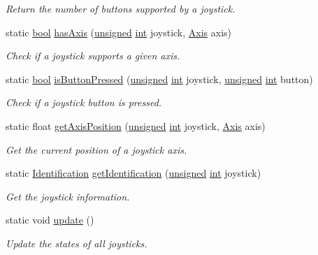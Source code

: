 \begin{DoxyCompactItemize}
\begin{DoxyCompactList}\small\item\em Return the number of buttons supported by a joystick. \end{DoxyCompactList}\item 
static \hyperlink{term__entry_8h_a002004ba5d663f149f6c38064926abac}{bool} \hyperlink{classsf_1_1_joystick_a268e8f2a11ae6af4a47c727cb4ab4d95}{has\-Axis} (\hyperlink{curses_8priv_8h_aca40206900cfc164654362fa8d4ad1e6}{unsigned} \hyperlink{term__entry_8h_ad65b480f8c8270356b45a9890f6499ae}{int} joystick, \hyperlink{classsf_1_1_joystick_a48db337092c2e263774f94de6d50baa7}{Axis} axis)
\begin{DoxyCompactList}\small\item\em Check if a joystick supports a given axis. \end{DoxyCompactList}\item 
static \hyperlink{term__entry_8h_a002004ba5d663f149f6c38064926abac}{bool} \hyperlink{classsf_1_1_joystick_ae0d97a4b84268cbe6a7078e1b2717835}{is\-Button\-Pressed} (\hyperlink{curses_8priv_8h_aca40206900cfc164654362fa8d4ad1e6}{unsigned} \hyperlink{term__entry_8h_ad65b480f8c8270356b45a9890f6499ae}{int} joystick, \hyperlink{curses_8priv_8h_aca40206900cfc164654362fa8d4ad1e6}{unsigned} \hyperlink{term__entry_8h_ad65b480f8c8270356b45a9890f6499ae}{int} button)
\begin{DoxyCompactList}\small\item\em Check if a joystick button is pressed. \end{DoxyCompactList}\item 
static float \hyperlink{classsf_1_1_joystick_aea4930193331df1851b709f3060ba58b}{get\-Axis\-Position} (\hyperlink{curses_8priv_8h_aca40206900cfc164654362fa8d4ad1e6}{unsigned} \hyperlink{term__entry_8h_ad65b480f8c8270356b45a9890f6499ae}{int} joystick, \hyperlink{classsf_1_1_joystick_a48db337092c2e263774f94de6d50baa7}{Axis} axis)
\begin{DoxyCompactList}\small\item\em Get the current position of a joystick axis. \end{DoxyCompactList}\item 
static \hyperlink{structsf_1_1_joystick_1_1_identification}{Identification} \hyperlink{classsf_1_1_joystick_aa917c9435330e6e0368d3893672d1b74}{get\-Identification} (\hyperlink{curses_8priv_8h_aca40206900cfc164654362fa8d4ad1e6}{unsigned} \hyperlink{term__entry_8h_ad65b480f8c8270356b45a9890f6499ae}{int} joystick)
\begin{DoxyCompactList}\small\item\em Get the joystick information. \end{DoxyCompactList}\item 
static void \hyperlink{classsf_1_1_joystick_ab85fa9175b4edd3e5a07ee3cde0b0f48}{update} ()
\begin{DoxyCompactList}\small\item\em Update the states of all joysticks. \end{DoxyCompactList}\end{DoxyCompactItemize}


